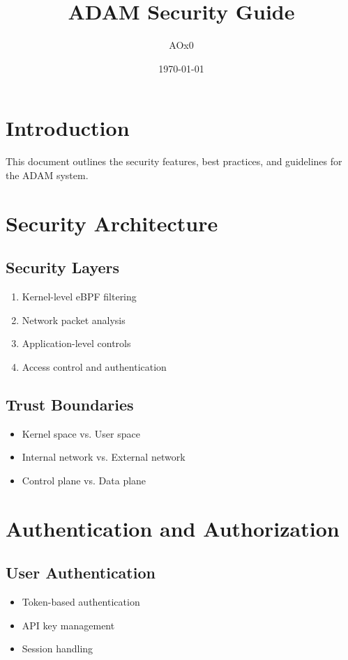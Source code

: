 \documentclass{article}
\title{ADAM Security Guide}
\author{AOx0}
\date{\today}
\begin{document}
\maketitle

\section{Introduction}
This document outlines the security features, best practices, and guidelines for the ADAM system.

\section{Security Architecture}

\subsection{Security Layers}
\begin{enumerate}[label=\arabic*.]
    \item Kernel-level eBPF filtering
    \item Network packet analysis
    \item Application-level controls
    \item Access control and authentication
\end{enumerate}

\subsection{Trust Boundaries}
\begin{itemize}
    \item Kernel space vs. User space
    \item Internal network vs. External network
    \item Control plane vs. Data plane
\end{itemize}

\section{Authentication and Authorization}

\subsection{User Authentication}
\begin{itemize}
    \item Token-based authentication
    \item API key management
    \item Session handling
\end{itemize}
\end{document}
